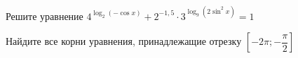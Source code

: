 \begin{ex}
	\begin{condition}
		\begin{enumcols}[label=\asbuk*)]
			\item Решите уравнение \( 4^{\log_2 {(-\cos x)}} + 2^{-1,5}\cdot3^{\log_9{(2\sin^2 x)}} =1 \)
			\item Найдите все корни уравнения, принадлежащие отрезку \( \left[-2\pi;-\dfrac{\pi}{2}\right] \)
		\end{enumcols}
	\end{condition}
\end{ex}
